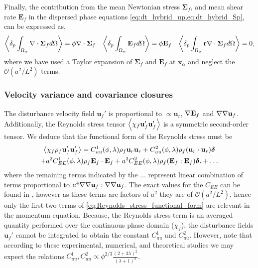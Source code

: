 Finally, the contribution from the mean Newtonian stress $\bm\Sigma_f$, and mean shear rate $\textbf{E}_f$ in the dispersed phase equations \eqref{eq:dt_hybrid_up,eq:dt_hybrid_Sp}, can be expressed as\citep{zhang1997momentum,morel2015mathematical}, 
\begin{align}
    \left<\delta_{p} \int_{\Omega_{\alpha}} \mathbf{\nabla}\cdot\bm\Sigma_f d\Omega\right> = \phi\mathbf{\nabla}\cdot\bm\Sigma_f 
    && \left<\delta_{p} \int_{\Omega_{\alpha}} \textbf{E}_f d\Omega\right> = \phi\textbf{E}_f 
    && \left<\delta_{p} \int_{\Omega_{\alpha}} \textbf{r}\mathbf{\nabla}\cdot\bm\Sigma_f d\Omega\right> =0, 
\end{align}
where we have used a Taylor expansion of $\bm\Sigma_f$ and $\textbf{E}_f$ at $\textbf{x}_\alpha$ and neglect the $\mathcal{O}(a^2/L^2)$ terms. 


\subsubsection{Velocity variance and covariance closures}


The disturbance velocity field $\textbf{u}_f'$ is proportional to $\propto \textbf{u}_r$, $\mathbf{\nabla}\textbf{E}_f$ and $\mathbf{\nabla}\mathbf{\nabla} \textbf{u}_f$.
Additionally, the Reynolds stress tensor $\left<\chi_f \textbf{u}_f'\textbf{u}_f'\right>$ is a symmetric second-order tensor. 
We deduce that the functional form of the Reynolds stress must be 
\begin{multline}
    \avg{\chi_f \rho_f \textbf{u}_f' \textbf{u}_f'}
    =
    C_{uu}^1(\phi,\lambda) \rho_f \textbf{u}_{r} \textbf{u}_{r}
    + C_{uu}^2(\phi,\lambda) \rho_f (\textbf{u}_{r}\cdot  \textbf{u}_{r})\bm\delta\\
    +a^2 C_{EE}^1(\phi,\lambda) \rho_f\textbf{E}_f\cdot \textbf{E}_f 
    +  a^2 C_{EE}^2(\phi,\lambda) \rho_f (\textbf{E}_f : \textbf{E}_f)\bm\delta.
    + \ldots
    \label{eq:Reynolds_stress_functional_form}
\end{multline}
where the remaining terms indicated by the $\ldots$ represent linear combination of terms proportional to $a^4\mathbf{\nabla}\mathbf{\nabla} \textbf{u}_f:\mathbf{\nabla}\mathbf{\nabla} \textbf{u}_f$. 
The exact values for the $C_{EE}$ can be found in \citet{raja2010inertial}, however as these terms are factors of $a^2$ they are of $\mathcal{O}(a^2/L^2)$, hence only the first two terms of \ref{eq:Reynolds_stress_functional_form} are relevant in the momentum equation. 
Because, the Reynolds stress term is an averaged quantity performed over the continuous phase domain ($\chi_f$), the disturbance fields $\textbf{u}_f'$ cannot be integrated to obtain the constant $C_{uu}^1$ and $C_{uu}^2$. 
However, note that according to these experimental\citep{cartellier2009induced}, numerical, and theoretical\citep{hill2001first} studies we may expect the relations $C_{uu}^1,C_{uu}^2 \propto \phi^{2/3} \frac{(2+3\lambda)^2}{(\lambda+1)^2}$. 


